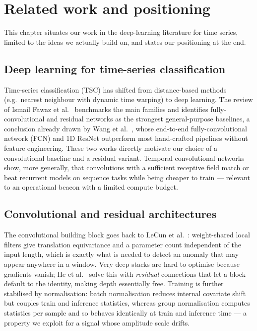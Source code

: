 \chapter{Related work and positioning}
\label{chap:related}

This chapter situates our work in the deep-learning literature for time series,
limited to the ideas we actually build on, and states our positioning at the
end.

\section{Deep learning for time-series classification}
\label{sec:rw-tsc}

Time-series classification (TSC) has shifted from distance-based methods
(e.g.\ nearest neighbour with dynamic time warping) to deep learning. The review
of Ismail Fawaz et al.\ \cite{intfawaz2019deep} benchmarks the main families and
identifies fully-convolutional and residual networks as the strongest
general-purpose baselines, a conclusion already drawn by Wang et al.\
\cite{wang2017time}, whose end-to-end fully-convolutional network (FCN) and 1D
ResNet outperform most hand-crafted pipelines without feature engineering. These
two works directly motivate our choice of a convolutional baseline and a
residual variant. Temporal convolutional networks \cite{bai2018empirical} show,
more generally, that convolutions with a sufficient receptive field match or beat
recurrent models on sequence tasks while being cheaper to train --- relevant to
an operational beacon with a limited compute budget.

\section{Convolutional and residual architectures}
\label{sec:rw-cnn}

The convolutional building block goes back to LeCun et al.\
\cite{lecun1998gradient}: weight-shared local filters give translation
equivariance and a parameter count independent of the input length, which is
exactly what is needed to detect an anomaly that may appear anywhere in a window.
Very deep stacks are hard to optimise because gradients vanish; He et al.\
\cite{he2016deep} solve this with \emph{residual} connections that let a block
default to the identity, making depth essentially free. Training is further
stabilised by normalisation: batch normalisation \cite{ioffe2015batch} reduces
internal covariate shift but couples train and inference statistics, whereas
group normalisation \cite{wu2018group} computes statistics per sample and so
behaves identically at train and inference time --- a property we exploit for a
signal whose amplitude scale drifts.

